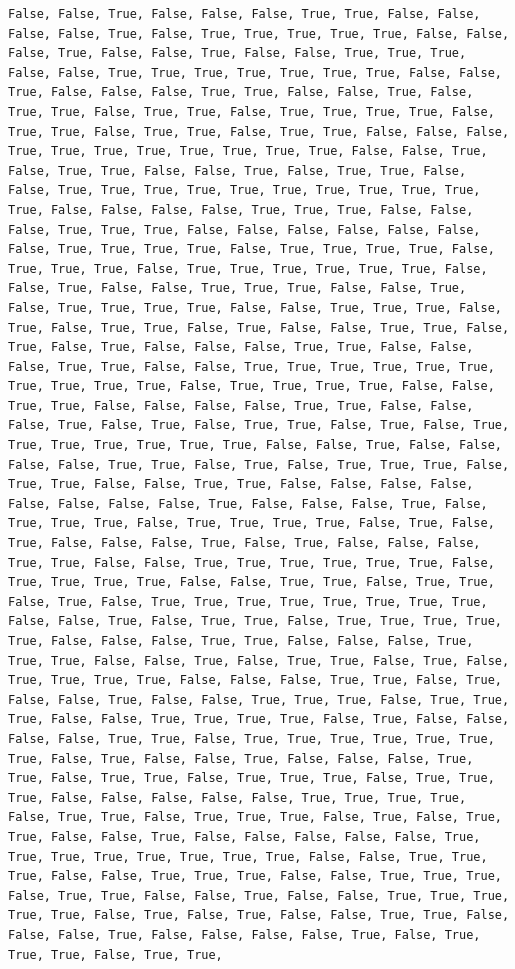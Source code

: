 \documentclass[
  letterpaper,
  DIV=11,
  numbers=noendperiod]{scrartcl}
\begin{document}
\begin{verbatim}
False, False, True, False, False, False, True, True, False, False, False, False, True, False, True, True, True, True, True, False, False, False, True, False, False, True, False, False, True, True, True, False, False, True, True, True, True, True, True, True, False, False, True, False, False, False, True, True, False, False, True, False, True, True, False, True, True, False, True, True, True, True, False, True, True, False, True, True, False, True, True, False, False, False, True, True, True, True, True, True, True, True, False, False, True, False, True, True, False, False, True, False, True, True, False, False, True, True, True, True, True, True, True, True, True, True, True, False, False, False, False, True, True, True, False, False, False, True, True, True, False, False, False, False, False, False, False, True, True, True, True, False, True, True, True, True, False, True, True, True, False, True, True, True, True, True, True, False, False, True, False, False, True, True, True, False, False, True, False, True, True, True, True, False, False, True, True, True, False, True, False, True, True, False, True, False, False, True, True, False, True, False, True, False, False, False, True, True, False, False, False, True, True, False, False, True, True, True, True, True, True, True, True, True, True, False, True, True, True, True, False, False, True, True, False, False, False, False, True, True, False, False, False, True, False, True, False, True, True, False, True, False, True, True, True, True, True, True, True, False, False, True, False, False, False, False, True, True, False, True, False, True, True, True, False, True, True, False, False, True, True, False, False, False, False, False, False, False, False, True, False, False, False, True, False, True, True, True, False, True, True, True, True, False, True, False, True, False, False, False, True, False, True, False, False, False, True, True, False, False, True, True, True, True, True, True, False, True, True, True, True, False, False, True, True, False, True, True, False, True, False, True, True, True, True, True, True, True, True, False, False, True, False, True, True, False, True, True, True, True, True, False, False, False, True, True, False, False, False, True, True, True, False, False, True, False, True, True, False, True, False, True, True, True, True, False, False, False, True, True, False, True, False, False, True, False, False, True, True, True, False, True, True, True, False, False, True, True, True, True, False, True, False, False, False, False, True, True, False, True, True, True, True, True, True, True, False, True, False, False, True, False, False, False, True, True, False, True, True, False, True, True, True, False, True, True, True, False, False, False, False, False, True, True, True, True, False, True, True, False, True, True, True, False, True, False, True, True, False, False, True, False, False, False, False, False, True, True, True, True, True, True, True, True, False, False, True, True, True, False, False, True, True, True, False, False, True, True, True, False, True, True, False, False, True, False, False, True, True, True, True, True, False, True, False, True, False, False, True, True, False, False, False, True, False, False, False, False, True, False, True, True, True, False, True, True, 
\end{verbatim}
\end{document}
